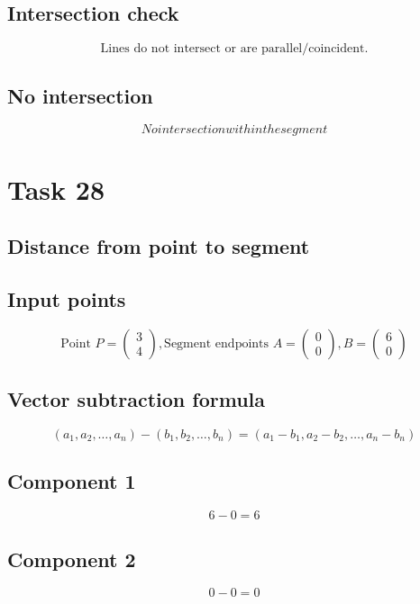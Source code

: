 \documentclass{article}
\begin{document}
\subsection*{ \vspace{1em} Intersection check}
\[
\text{Lines do not intersect or are parallel/coincident.}
\]
\subsection*{ \vspace{1em} No intersection}
\[
No intersection within the segment
\]
\bigskip

\hrulefill
\bigskip

\section*{Task 28}

\subsection*{Distance from point to segment}
\subsection*{ \vspace{1em} Input points}
\[
\text{Point } P = \begin{pmatrix}3 \\ 4\end{pmatrix},
      \text{Segment endpoints } A = \begin{pmatrix}0 \\ 0\end{pmatrix}, B = \begin{pmatrix}6 \\ 0\end{pmatrix}
\]
\subsection*{ \vspace{1em} Vector subtraction formula}
\[
(a_1, a_2, \dots, a_n) - (b_1, b_2, \dots, b_n) = (a_1 - b_1, a_2 - b_2, \dots, a_n - b_n)
\]
\subsection*{ \vspace{1em} Component 1}
\[
6 - 0 = 6
\]
\subsection*{ \vspace{1em} Component 2}
\[
0 - 0 = 0
\]
\end{document}

